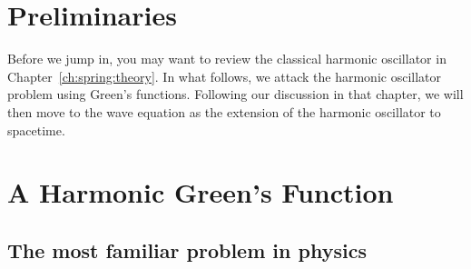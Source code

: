 

\chapter{Preliminaries}

Before we jump in, you may want to review the classical harmonic oscillator in Chapter~\ref{ch:spring:theory}. In what follows, we attack the harmonic oscillator problem using Green's functions. Following our discussion in that chapter, we will then move to the wave equation as the extension of the harmonic oscillator to spacetime.

\chapter{A Harmonic Green's Function}


\section{The most familiar problem in physics}

